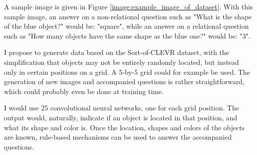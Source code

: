 \documentclass{setup}
\begin{document}
	A sample image is given in Figure \ref{image:example_image_of_dataset}. With this sample image, an answer on a non-relational question such as "What is the shape of the blue object?" would be: "square", while an answer on a relational question such as "How many objects have the same shape as the blue one?" would be: "3".

	I propose to generate data based on the Sort-of-CLEVR dataset, with the simplification that objects may not be entirely randomly located, but instead only in certain positions on a grid. A 5-by-5 grid could for example be used. The generation of new images and accompanied questions is rather straightforward, which could probably even be done at training time.
	
	I would use 25 convolutional neural networks, one for each grid position. The output would, naturally, indicate if an object is located in that position, and what its shape and color is. Once the location, shapes and colors of the objects are known, rule-based mechanisms can be used to answer the accompanied questions.

	 
	 
	
\end{document}
